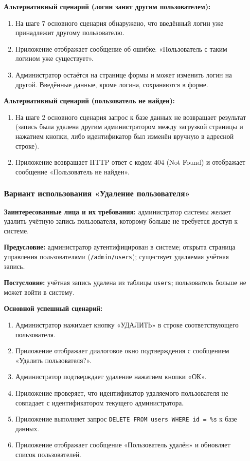 \textbf{Альтернативный сценарий (логин занят другим пользователем):}
\begin{enumerate}
	\item На шаге 7 основного сценария обнаружено, что введённый логин уже принадлежит другому пользователю.
	\item Приложение отображает сообщение об ошибке: «Пользователь с таким логином уже существует».
	\item Администратор остаётся на странице формы и может изменить логин на другой. Введённые данные, кроме логина, сохраняются в форме.
\end{enumerate}

\textbf{Альтернативный сценарий (пользователь не найден):}
\begin{enumerate}
	\item На шаге 2 основного сценария запрос к базе данных не возвращает результат (запись была удалена другим администратором между загрузкой страницы и нажатием кнопки, либо идентификатор был изменён вручную в адресной строке).
	\item Приложение возвращает HTTP-ответ с кодом 404 (Not Found) и отображает сообщение «Пользователь не найден».
\end{enumerate}

\subsubsection{Вариант использования «Удаление пользователя»}

\textbf{Заинтересованные лица и их требования:} администратор системы желает удалить учётную запись пользователя, которому больше не требуется доступ к системе.

\textbf{Предусловие:} администратор аутентифицирован в системе; открыта страница управления пользователями (\texttt{/admin/users}); существует удаляемая учётная запись.

\textbf{Постусловие:} учётная запись удалена из таблицы \texttt{users}; пользователь больше не может войти в систему.

\textbf{Основной успешный сценарий:}
\begin{enumerate}
	\item Администратор нажимает кнопку «УДАЛИТЬ» в строке соответствующего пользователя.
	\item Приложение отображает диалоговое окно подтверждения с сообщением «Удалить пользователя?».
	\item Администратор подтверждает удаление нажатием кнопки «ОК».
	\item Приложение проверяет, что идентификатор удаляемого пользователя не совпадает с идентификатором текущего администратора.
	\item Приложение выполняет запрос \texttt{DELETE FROM users WHERE id = \%s} к базе данных.
	\item Приложение отображает сообщение «Пользователь удалён» и обновляет список пользователей.
\end{enumerate}

